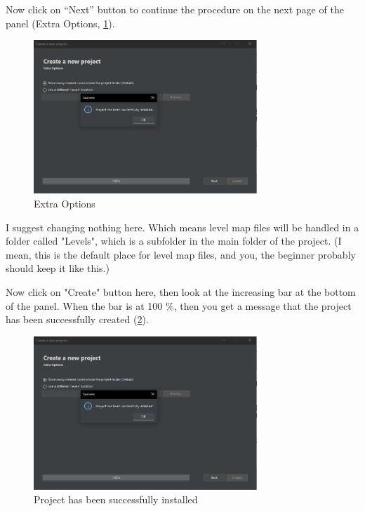 \par Now click on “Next” button to continue the procedure on the next page of the panel (Extra Options, \ref{fig:tide2}).

\begin{figure}
    \centering
     \includegraphics[width=0.75\textwidth]{screenshots/2.jpg}
     \caption{Extra Options}
     \label{fig:tide2}
\end{figure}

\par I suggest changing nothing here. Which means level map files will be handled in a folder called "Levels", which is a subfolder in the main folder of the project. (I mean, this is the default place for level map files, and you, the beginner probably should keep it like this.)
\par Now click on "Create" button here, then look at the increasing bar at the bottom of the panel.
When the bar is at 100 \%, then you get a message that the project has been successfully created (\ref{fig:tide3}).

\begin{figure}
    \centering
     \includegraphics[width=0.75\textwidth]{screenshots/3.jpg}
     \caption{Project has been successfully installed}
     \label{fig:tide3}
\end{figure}

